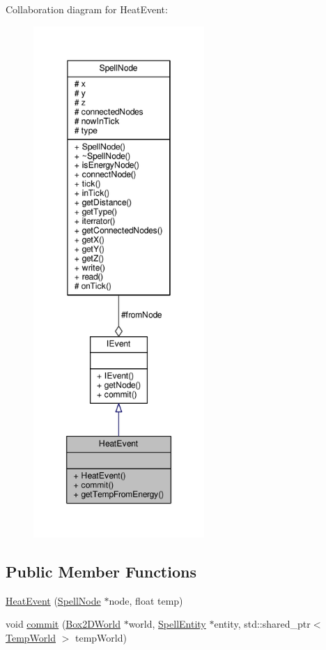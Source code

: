 Collaboration diagram for Heat\-Event\-:
\nopagebreak
\begin{figure}[H]
\begin{center}
\leavevmode
\includegraphics[height=550pt]{class_heat_event__coll__graph}
\end{center}
\end{figure}
\subsection*{Public Member Functions}
\begin{DoxyCompactItemize}
\item 
\hyperlink{class_heat_event_a7015a08ccd75b135599dd40b755c5e68}{Heat\-Event} (\hyperlink{class_spell_node}{Spell\-Node} $\ast$node, float temp)
\item 
void \hyperlink{class_heat_event_a9dcc28accc54844fc128daff999f2f22}{commit} (\hyperlink{class_box2_d_world}{Box2\-D\-World} $\ast$world, \hyperlink{class_spell_entity}{Spell\-Entity} $\ast$entity, std\-::shared\-\_\-ptr$<$ \hyperlink{_server_8hpp_ac147588bd69e1d052194e0dea10202ff}{Temp\-World} $>$ temp\-World)
\end{DoxyCompactItemize}
